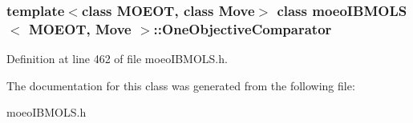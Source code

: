 \subsubsection*{template$<$class MOEOT, class Move$>$ class moeo\-IBMOLS$<$ MOEOT, Move $>$::One\-Objective\-Comparator}





Definition at line 462 of file moeo\-IBMOLS.h.

The documentation for this class was generated from the following file:\begin{CompactItemize}
\item 
moeo\-IBMOLS.h\end{CompactItemize}
